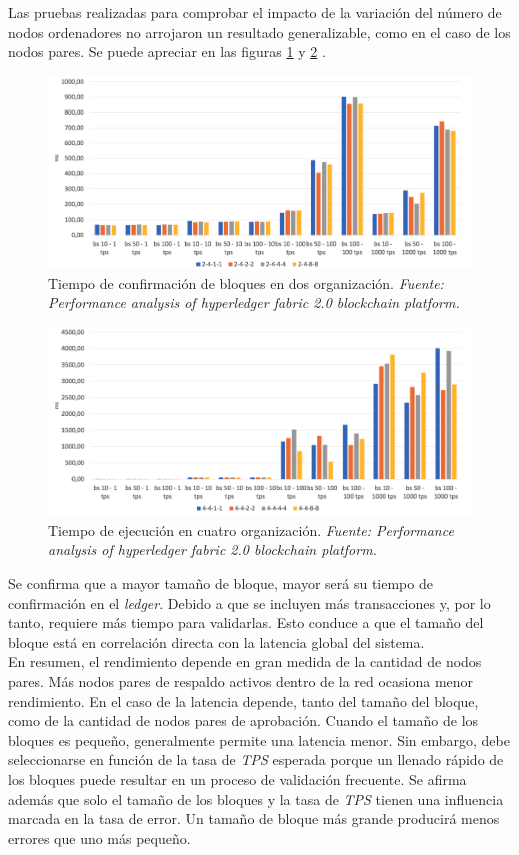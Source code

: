 Las pruebas realizadas para comprobar el impacto de la variaci\'on del n\'umero de nodos ordenadores no arrojaron un resultado generalizable, como en el caso de los nodos pares. Se puede apreciar en las figuras \ref{BlockCommitOrderes} y \ref{EscalaOrderesCuatroOrganizacion} .\\

\begin{figure}[h]
\centering
\includegraphics[width=0.6\linewidth]{Graphics/BlockCommitOrderes.png}
\caption{Tiempo de confirmaci\'on de bloques en dos organizaci\'on. \emph{Fuente: Performance analysis of hyperledger fabric 2.0 blockchain platform.}}
\label{BlockCommitOrderes}
\end{figure}

\begin{figure}[h]
\centering
\includegraphics[width=0.6\linewidth]{Graphics/EscalaOrderesCuatroOrganizaciones.png}
\caption{Tiempo de ejecuci\'on en cuatro organizaci\'on. \emph{Fuente: Performance analysis of hyperledger fabric 2.0 blockchain platform.}}
\label{EscalaOrderesCuatroOrganizacion}
\end{figure}

Se confirma que a mayor tama\~no de bloque, mayor ser\'a su tiempo de confirmaci\'on en el \emph{ledger}. Debido a que se incluyen m\'as transacciones y, por lo tanto, requiere m\'as tiempo para validarlas. Esto conduce a que el tama\~no del bloque est\'a en correlaci\'on directa con la latencia global del sistema.\\

En resumen, el rendimiento depende en gran medida de la cantidad de nodos pares. M\'as nodos pares de respaldo activos dentro de la red ocasiona menor rendimiento. En el caso de la latencia depende, tanto del tama\~no del bloque, como de la cantidad de nodos pares de aprobaci\'on. Cuando el tama\~no de los bloques es peque\~no, generalmente permite una latencia menor. Sin embargo, debe seleccionarse en funci\'on de la tasa de \emph{TPS} esperada porque un llenado r\'apido de los bloques puede resultar en un proceso de validaci\'on frecuente. Se afirma adem\'as que solo el tama\~no de los bloques y la tasa de \emph{TPS} tienen una influencia marcada en la tasa de error. Un tama\~no de bloque m\'as grande producir\'a menos errores que uno m\'as peque\~no.